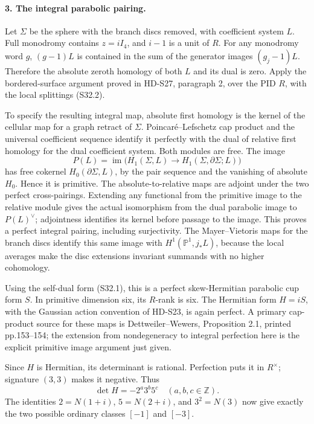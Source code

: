 \paragraph{3. The integral parabolic pairing.}
Let \(\Sigma\) be the sphere with the branch discs removed, with
coefficient system \(L\). Full monodromy contains \(z=iI_4\),
and \(i-1\) is a unit of \(R\). For any monodromy word \(g\),
\((g-1)L\) is contained in the sum of the generator images
\((g_j-1)L\). Therefore the absolute zeroth homology of both
\(L\) and its dual is zero. Apply the bordered-surface argument
proved in HD-S27, paragraph 2, over the PID \(R\), with the local
splittings (S32.2).

To specify the resulting integral map, absolute first homology is
the kernel of the cellular map for a graph retract of \(\Sigma\).
Poincar\'e--Lefschetz cap product and the universal coefficient
sequence identify it perfectly with the dual of relative first
homology for the dual coefficient system. Both modules are free.
The image
\[
 P(L)=\operatorname{im}\bigl(H_1(\Sigma,L)
              \longrightarrow H_1(\Sigma,\partial\Sigma;L)\bigr)
\]
has free cokernel \(H_0(\partial\Sigma,L)\), by the pair sequence
and the vanishing of absolute \(H_0\). Hence it is primitive.
The absolute-to-relative maps are adjoint under the two perfect
cross-pairings. Extending any functional from the primitive image
to the relative module gives the actual isomorphism from the dual
parabolic image to \(P(L)^\vee\); adjointness identifies its
kernel before passage to the image. This proves a perfect integral
pairing, including surjectivity. The Mayer--Vietoris maps for the
branch discs identify this same image with
\(H^1(\mathbb P^1,j_*L)\), because the local averages make the
disc extensions invariant summands with no higher cohomology.

Using the self-dual form (S32.1), this is a perfect skew-Hermitian
parabolic cup form \(S\). In primitive dimension six, its
\(R\)-rank is six. The Hermitian form \(H=iS\), with the
Gaussian action convention of HD-S23, is again perfect. A primary
cap-product source for these maps is Dettweiler--Wewers,
Proposition 2.1, printed pp.153--154; the extension from
nondegeneracy to integral perfection here is the explicit primitive
image argument just given.

Since \(H\) is Hermitian, its determinant is rational. Perfection
puts it in \(R^\times\); signature \((3,3)\) makes it negative.
Thus
\[
 \det H=-2^a3^b5^c\quad(a,b,c\in\mathbb Z).
\]
The identities \(2=N(1+i)\), \(5=N(2+i)\), and
\(3^2=N(3)\) now give exactly the two possible ordinary classes
\([-1]\) and \([-3]\).


